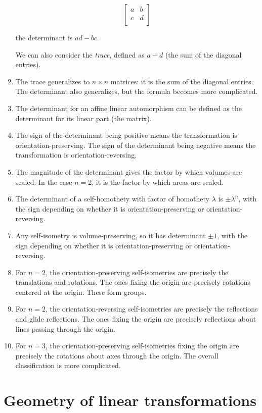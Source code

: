 \documentclass[10pt]{amsart}
\begin{document}
\begin{enumerate}
  $$\left[\begin{matrix} a & b \\ c & d \\\end{matrix}\right]$$

  the determinant is $ad - bc$.

  We can also consider the {\em trace}, defined as $a + d$ (the sum of
  the diagonal entries).
\item The trace generalizes to $n \times n$ matrices: it is the sum of
  the diagonal entries. The determinant also generalizes, but the
  formula becomes more complicated.
\item The determinant for an affine linear automorphism can be defined
  as the determinant for its linear part (the matrix).
\item The sign of the determinant being positive means the
  transformation is orientation-preserving. The sign of the
  determinant being negative means the transformation is
  orientation-reversing.
\item The magnitude of the determinant gives the factor by which
  volumes are scaled. In the case $n = 2$, it is the factor by which
  areas are scaled.
\item The determinant of a self-homothety with factor of homothety
  $\lambda$ is $\pm \lambda^n$, with the sign depending on whether it
  is orientation-preserving or orientation-reversing.
\item Any self-isometry is volume-preserving, so it has determinant
  $\pm 1$, with the sign depending on whether it is
  orientation-preserving or orientation-reversing.
\item For $n = 2$, the orientation-preserving self-isometries are
  precisely the translations and rotations. The ones fixing the origin
  are precisely rotations centered at the origin. These form groups.
\item For $n = 2$, the orientation-reversing self-isometries are
  precisely the reflections and glide reflections. The ones fixing the
  origin are precisely reflections about lines passing through the
  origin.
\item For $n = 3$, the orientation-preserving self-isometries fixing
  the origin are precisely the rotations about axes through the
  origin. The overall classification is more complicated.
\end{enumerate}

\section{Geometry of linear transformations}
\end{document}
